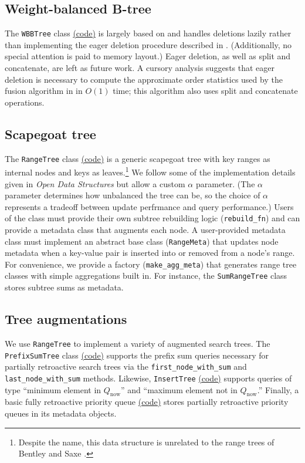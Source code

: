 \documentclass{article}
\newcommand{\Qnow}{Q_{\text{now}}}
\begin{document}
\subsection{Weight-balanced B-tree}
The \texttt{WBBTree} class \href{https://github.com/6851-2021/retroactive-pq/blob/main/retroactive_pq/wb_btree.py}{(code)} is largely based on \cite{arge2003optimal} and handles deletions lazily rather than implementing the eager deletion procedure described in \cite{bender2005cache}. (Additionally, no special attention is paid to memory layout.) Eager deletion, as well as split and concatenate, are left as future work. A cursory analysis suggests that eager deletion is necessary to compute the approximate order statistics used by the fusion algorithm in \cite{demaine2015polylogarithmic} in $O(1)$ time; this algorithm also uses split and concatenate operations.


\subsection{Scapegoat tree}
The \texttt{RangeTree} class \href{https://github.com/6851-2021/retroactive-pq/blob/main/retroactive_pq/range_scapegoat.py}{(code)} is a generic scapegoat tree with key ranges as internal nodes and keys as leaves.\footnote{Despite the name, this data structure is unrelated to the range trees of Bentley and Saxe \cite{bentley1980decomposable}.} We follow some of the implementation details given in \emph{Open Data Structures} \cite{ods} but allow a custom $\alpha$ parameter. (The $\alpha$ parameter determines how unbalanced the tree can be, so the choice of $\alpha$ represents a tradeoff between update perfrmance and query performance.)   Users of the class must provide their own subtree rebuilding logic (\texttt{rebuild\_fn}) and can provide a metadata class that augments each node. A user-provided metadata class must implement an abstract base class (\texttt{RangeMeta}) that updates node metadata when a key-value pair is inserted into or removed from a node's range. For convenience, we provide a factory (\texttt{make\_agg\_meta}) that generates range tree classes with simple aggregations built in. For instance, the \texttt{SumRangeTree} class stores subtree sums as metadata.

\subsection{Tree augmentations}
We use \texttt{RangeTree} to implement a variety of augmented search trees. The \texttt{PrefixSumTree} class \href{https://github.com/6851-2021/retroactive-pq/blob/main/retroactive_pq/prefix_sum_tree.py}{(code)} supports the prefix sum queries necessary for partially retroactive search trees via the \texttt{first\_node\_with\_sum} and \texttt{last\_node\_with\_sum} methods. Likewise, \texttt{InsertTree} \href{https://github.com/6851-2021/retroactive-pq/blob/main/retroactive_pq/insert_tree.py}{(code)} supports queries of type ``minimum element in $\Qnow$'' and ``maximum element not in $\Qnow$.'' Finally, a basic fully retroactive priority queue \href{https://github.com/6851-2021/retroactive-pq/blob/main/retroactive_pq/full_pq.py}{(code)} stores partially retroactive priority queues in its metadata objects.
\end{document}
